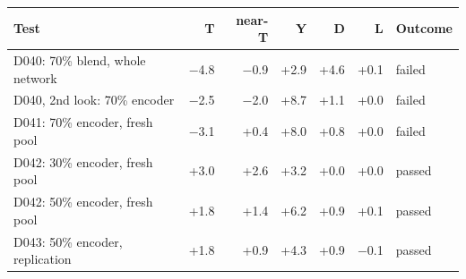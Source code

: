 
\begin{tabular}{lrrrrrl}
\toprule
Test & T & near-T & Y & D & L & Outcome \\
\midrule
D040: 70\% blend, whole network & $-$4.8 & $-$0.9 & +2.9 & +4.6 & +0.1 & failed \\
D040, 2nd look: 70\% encoder & $-$2.5 & $-$2.0 & +8.7 & +1.1 & +0.0 & failed \\
D041: 70\% encoder, fresh pool & $-$3.1 & +0.4 & +8.0 & +0.8 & +0.0 & failed \\
D042: 30\% encoder, fresh pool & +3.0 & +2.6 & +3.2 & +0.0 & +0.0 & passed \\
D042: 50\% encoder, fresh pool & +1.8 & +1.4 & +6.2 & +0.9 & +0.1 & passed \\
D043: 50\% encoder, replication & +1.8 & +0.9 & +4.3 & +0.9 & $-$0.1 & passed \\
\bottomrule
\end{tabular}
